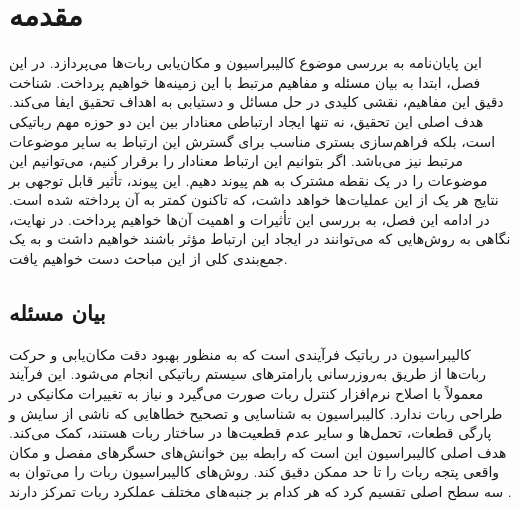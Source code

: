 
\chapter{مقدمه}

این پایان‌نامه به بررسی موضوع کالیبراسیون و مکان‌یابی ربات‌ها می‌پردازد. در این فصل، ابتدا به بیان مسئله و مفاهیم مرتبط با این زمینه‌ها خواهیم پرداخت. شناخت دقیق این مفاهیم، نقشی کلیدی در حل مسائل و دستیابی به اهداف تحقیق ایفا می‌کند. هدف اصلی این تحقیق، نه تنها ایجاد ارتباطی معنادار بین این دو حوزه مهم رباتیکی است، بلکه فراهم‌سازی بستری مناسب برای گسترش این ارتباط به سایر موضوعات مرتبط نیز می‌باشد. اگر بتوانیم این ارتباط معنادار را برقرار کنیم، می‌توانیم این موضوعات را در یک نقطه مشترک به هم پیوند دهیم. این پیوند، تأثیر قابل توجهی بر نتایج هر یک از این عملیات‌ها خواهد داشت، که تاکنون کمتر به آن پرداخته شده است. در ادامه این فصل، به بررسی این تأثیرات و اهمیت آن‌ها خواهیم پرداخت. در نهایت، نگاهی به روش‌هایی که می‌توانند در ایجاد این ارتباط مؤثر باشند خواهیم داشت و به یک جمع‌بندی کلی از این مباحث دست خواهیم یافت.


\section{بیان مسئله}
کالیبراسیون در رباتیک فرآیندی است که به منظور بهبود دقت مکان‌یابی و حرکت ربات‌ها از طریق به‌روزرسانی پارامترهای سیستم رباتیکی انجام می‌شود. این فرآیند معمولاً با اصلاح نرم‌افزار کنترل ربات صورت می‌گیرد و نیاز به تغییرات مکانیکی در طراحی ربات ندارد. کالیبراسیون به شناسایی و تصحیح خطاهایی که ناشی از سایش و پارگی قطعات، تحمل‌ها و سایر عدم قطعیت‌ها در ساختار ربات هستند، کمک می‌کند. هدف اصلی کالیبراسیون این است که رابطه بین خوانش‌های حسگرهای مفصل و مکان واقعی پتجه ربات را تا حد ممکن دقیق کند. 
\cite{roth1987overview}
روش‌های کالیبراسیون ربات را می‌توان به سه سطح اصلی تقسیم کرد که هر کدام بر جنبه‌های مختلف عملکرد ربات تمرکز دارند
\cite{elatta2004overview, roth1987overview}.

